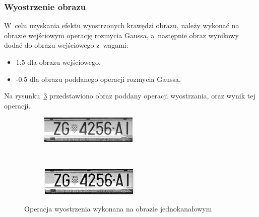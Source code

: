 \subsubsection{Wyostrzenie obrazu}
 W~celu uzyskania efektu wyostrzonych krawędzi obrazu, należy wykonać na obrazie wejściowym operację rozmycia Gaussa, a~następnie obraz wynikowy dodać do obrazu wejściowego z~wagami:
\begin{itemize}
  \item 1.5 dla obrazu wejściowego,
  \item -0.5 dla obrazu poddanego operacji rozmycia Gaussa.
\end{itemize}Na rysunku~\ref{fig:image_sharpen} przedstawiono obraz poddany operacji wyostrzania, oraz wynik tej operacji.
\begin{figure}
  \centering
  \begin{subfigure}[b]{0.45\textwidth}
    \includegraphics[width=\textwidth]{img/image-sharpen-before}
    \label{fig:image_sharpen_before}
  \end{subfigure}
  ~
  \begin{subfigure}[b]{0.45\textwidth}
    \includegraphics[width=\textwidth]{img/image-sharpen-after}
    \label{fig:image_sharpen_after}
  \end{subfigure}
  \caption{Operacja wyostrzenia wykonana na obrazie jednokanałowym}
  \label{fig:image_sharpen}
\end{figure}
